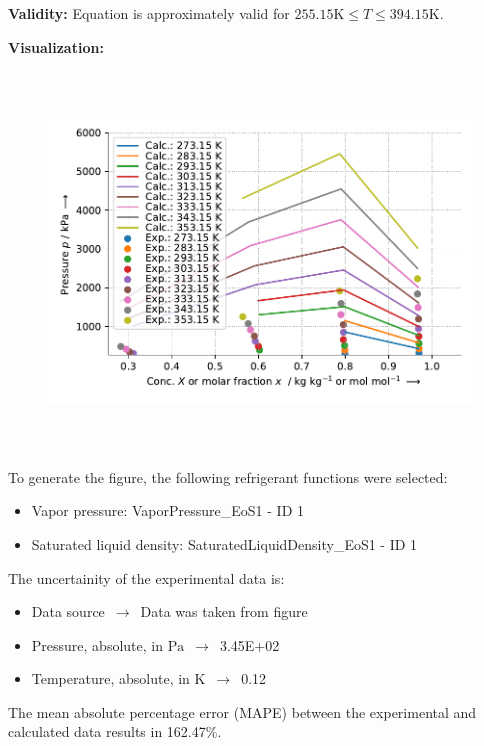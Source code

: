 \textbf{Validity:}
\newline
Equation is approximately valid for $255.15 \si{\kelvin} \leq T \leq 394.15 \si{\kelvin}$.
\newline

\textbf{Visualization:}
%
\begin{figure}[!htp]
{\noindent\includegraphics[height=10cm, keepaspectratio]{figs/abs/abs_R-12_paraffinic__UniquacFixedDu_1.pdf}}
\end{figure}
%

To generate the figure, the following refrigerant functions were selected:
\begin{itemize}
\item Vapor pressure: VaporPressure\_EoS1 - ID 1
\item Saturated liquid density: SaturatedLiquidDensity\_EoS1 - ID 1
\end{itemize}

The uncertainity of the experimental data is:
\begin{itemize}
\item Data source $\,\to\,$ Data was taken from figure
\item Pressure, absolute, in $\si{\pascal}$ $\,\to\,$ 3.45E+02
\item Temperature, absolute, in $\si{\kelvin}$ $\,\to\,$ 0.12
\end{itemize}

The mean absolute percentage error (MAPE) between the experimental and calculated data results in 162.47\%.
\FloatBarrier
\newpage
